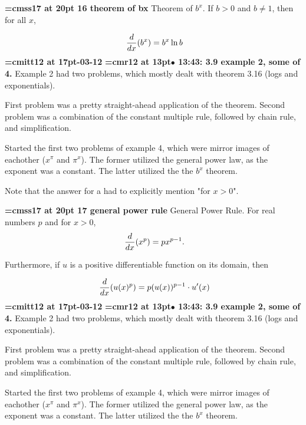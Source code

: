 {\medskip\noindent\bf\font\titlefont=cmss17 at 20pt 16 theorem of bx}\medskip
Theorem of $b^x$.
If $b > 0$ and $b \ne 1$, then for all $x$,

$$\
{d \over dx}(b^x) = b^x \ln b
$$
{\medskip\noindent\bf\font\titlefont=cmitt12 at 17pt-03-12}\medskip
{\smallskip\noindent\bf\font\titlefont=cmr12 at 13pt\titlefont $\bullet$ 13:43: 3.9 example 2, some of 4.}\smallskip
Example 2 had two problems, which mostly dealt with theorem 3.16 (logs and exponentials).
\par

First problem was a pretty straight-ahead application of the theorem. Second problem was a combination of the constant multiple rule, followed by chain rule, and simplification.
\par

Started the first two problems of example 4, which were mirror images of eachother ($x^\pi$ and $\pi^x$). The former utilized the general power law, as the exponent was a constant. The latter utilized the the $b^x$ theorem.
\par

Note that the answer for a had to explicitly mention "for $x > 0$".
\par

{\medskip\noindent\bf\font\titlefont=cmss17 at 20pt 17 general power rule}\medskip
General Power Rule.
For real numbers $p$ and for $x > 0$,
$$\
{d \over dx}(x^p) = px^{p - 1}.
$$

Furthermore, if $u$ is a positive differentiable function
on its domain, then

$$\
{d \over dx} (u(x)^p) = p(u(x))^{p - 1} \cdot u'(x)
$$
{\medskip\noindent\bf\font\titlefont=cmitt12 at 17pt-03-12}\medskip
{\smallskip\noindent\bf\font\titlefont=cmr12 at 13pt\titlefont $\bullet$ 13:43: 3.9 example 2, some of 4.}\smallskip
Example 2 had two problems, which mostly dealt with theorem 3.16 (logs and exponentials).
\par

First problem was a pretty straight-ahead application of the theorem. Second problem was a combination of the constant multiple rule, followed by chain rule, and simplification.
\par

Started the first two problems of example 4, which were mirror images of eachother ($x^\pi$ and $\pi^x$). The former utilized the general power law, as the exponent was a constant. The latter utilized the the $b^x$ theorem.
\par

